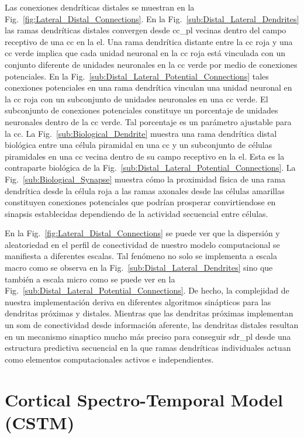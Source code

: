 {Las conexiones dendríticas distales se muestran en la Fig.~\ref{fig:Lateral_Distal_Connections}.
En la Fig.~\ref{sub:Distal_Lateral_Dendrites} las ramas dendríticas distales convergen desde \gls{cc_pl} vecinas dentro del campo receptivo de una \gls{cc} en la \gls{el}.
Una rama dendrítica distante entre la \gls{cc} roja y una \gls{cc} verde implica que cada unidad neuronal en la \gls{cc} roja está vinculada con un conjunto diferente de unidades neuronales en la \gls{cc} verde por medio de conexiones potenciales.
En la Fig.~\ref{sub:Distal_Lateral_Potential_Connections} tales conexiones potenciales en una rama dendrítica vinculan una unidad neuronal en la \gls{cc} roja con un subconjunto de unidades neuronales en una \gls{cc} verde.
El subconjunto de conexiones potenciales constituye un porcentaje de unidades neuronales dentro de la \gls{cc} verde.
Tal porcentaje es un parámetro ajustable para la \gls{cc}.
La Fig.~\ref{sub:Biological_Dendrite} muestra una rama dendrítica distal biológica entre una célula piramidal en una \gls{cc} y un subconjunto de células piramidales en una \gls{cc} vecina dentro de su campo receptivo en la \gls{el}.
Esta es la contraparte biológica de la Fig.~\ref{sub:Distal_Lateral_Potential_Connections}.
La Fig.~\ref{sub:Biological_Synapse} muestra cómo la proximidad física de una rama dendrítica desde la célula roja a las ramas axonales desde las células amarillas constituyen conexiones potenciales que podrían prosperar convirtiendose en sinapsis establecidas dependiendo de la actividad secuencial entre células.

En la Fig.~\ref{fig:Lateral_Distal_Connections} se puede ver que la dispersión y aleatoriedad en el perfil de conectividad de nuestro modelo computacional se manifiesta a diferentes escalas.
Tal fenómeno no solo se implementa a escala macro como se observa en la Fig.~\ref{sub:Distal_Lateral_Dendrites} sino que también a escala micro como se puede ver en la Fig.~\ref{sub:Distal_Lateral_Potential_Connections}.
De hecho, la complejidad de nuestra implementación deriva en diferentes algoritmos sinápticos para las dendritas próximas y distales.
Mientras que las dendritas próximas implementan un \gls{som} de conectividad desde información aferente, las dendritas distales resultan en un mecanismo sinaptico mucho más preciso para conseguir \gls{sdr_pl} desde una estructura predictiva secuencial en la que ramas dendríticas individuales actuan como elementos computacionales activos e independientes.
}{
\section{Cortical Spectro-Temporal Model (CSTM)}

}

